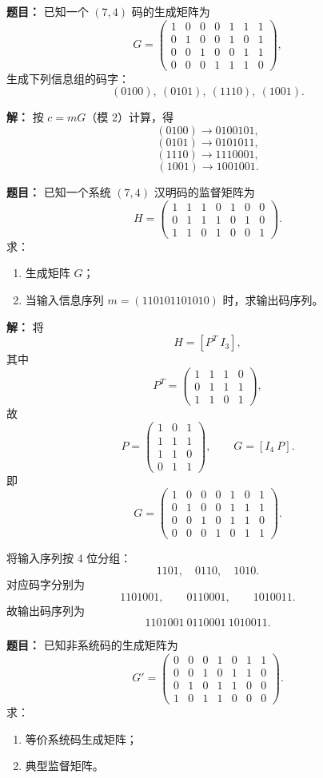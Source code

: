 \medskip
{}
\textbf{题目：}
已知一个 $(7,4)$ 码的生成矩阵为
\[
G=
\begin{pmatrix}
1&0&0&0&1&1&1\\
0&1&0&0&1&0&1\\
0&0&1&0&0&1&1\\
0&0&0&1&1&1&0
\end{pmatrix},
\]
生成下列信息组的码字：
\[
(0100),\ (0101),\ (1110),\ (1001).
\]

\par\textbf{解：}
按 $c=mG$（模 2）计算，得
\[
(0100)\to 0100101,
\]
\[
(0101)\to 0101011,
\]
\[
(1110)\to 1110001,
\]
\[
(1001)\to 1001001.
\]

\medskip
{}
\textbf{题目：}
已知一个系统 $(7,4)$ 汉明码的监督矩阵为
\[
H=
\begin{pmatrix}
1&1&1&0&1&0&0\\
0&1&1&1&0&1&0\\
1&1&0&1&0&0&1
\end{pmatrix}.
\]
求：
\begin{enumerate}
\item 生成矩阵 $G$；
\item 当输入信息序列 $m=(110101101010)$ 时，求输出码序列。
\end{enumerate}

\par\textbf{解：}
将
\[
H=[P^T\ I_3],
\]
其中
\[
P^T=
\begin{pmatrix}
1&1&1&0\\
0&1&1&1\\
1&1&0&1
\end{pmatrix},
\]
故
\[
P=
\begin{pmatrix}
1&0&1\\
1&1&1\\
1&1&0\\
0&1&1
\end{pmatrix},
\qquad
G=[I_4\ P].
\]
即
\[
G=
\begin{pmatrix}
1&0&0&0&1&0&1\\
0&1&0&0&1&1&1\\
0&0&1&0&1&1&0\\
0&0&0&1&0&1&1
\end{pmatrix}.
\]

将输入序列按 4 位分组：
\[
1101,\quad 0110,\quad 1010.
\]
对应码字分别为
\[
1101001,\qquad 0110001,\qquad 1010011.
\]
故输出码序列为
\[
1101001\ 0110001\ 1010011.
\]

\medskip
{}
\textbf{题目：}
已知非系统码的生成矩阵为
\[
G'=
\begin{pmatrix}
0&0&0&1&0&1&1\\
0&0&1&0&1&1&0\\
0&1&0&1&1&0&0\\
1&0&1&1&0&0&0
\end{pmatrix}.
\]
求：
\begin{enumerate}
\item 等价系统码生成矩阵；
\item 典型监督矩阵。
\end{enumerate}

